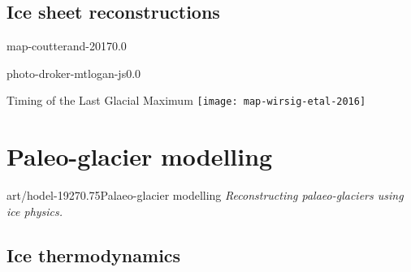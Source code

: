 \begin{CJK}{UTF8}{min}
\subsection{Ice sheet reconstructions}

    \begin{backgroundframe}[b]{map-coutterand-2017}{0.0}{}
      \flushright{}
    \end{backgroundframe}

    \begin{backgroundframe}[b]{photo-droker-mtlogan-js}{0.0}{}
      \flushleft{}
    \end{backgroundframe}

    \begin{frame}{Timing of the Last Glacial Maximum}
      \texttt{[image: map-wirsig-etal-2016]}
    \end{frame}


\section{Paleo-glacier modelling}

    \begin{sectionframe}{art/hodel-1927}{0.75}{Palaeo-glacier modelling}
      \emph{Reconstructing palaeo-glaciers using ice physics.}
    \end{sectionframe}


\subsection{Ice thermodynamics}


\end{CJK}

